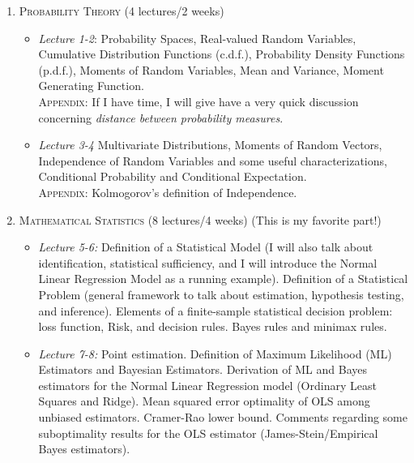 \documentclass[11pt]{article}
\begin{document}
\begin{enumerate}
\item {\scshape Probability Theory} (4 lectures/2 weeks)
\begin{itemize}
\item \emph{Lecture 1-2}: Probability Spaces, Real-valued Random Variables, Cumulative Distribution Functions (c.d.f.),  Probability Density Functions (p.d.f.), Moments of Random Variables, Mean and Variance, Moment Generating Function. \\

{\scshape Appendix:} If I have time, I will give have a very quick discussion concerning \emph{distance between probability measures}. \\

\item \emph{Lecture 3-4} Multivariate Distributions, Moments of Random Vectors, Independence of Random Variables and some useful characterizations, Conditional Probability and Conditional Expectation.  \\

{\scshape Appendix:} Kolmogorov\textquoteright s definition of Independence. \\
\end{itemize}
\item {\scshape Mathematical Statistics} (8 lectures/4 weeks) (This is my favorite part!)
\begin{itemize}
\item \emph{Lecture 5-6:} Definition of a Statistical Model (I will also talk about identification, statistical sufficiency, and I will introduce the Normal Linear Regression Model as a running example). Definition of a Statistical Problem (general framework to talk about estimation, hypothesis testing, and inference). Elements of a finite-sample statistical decision problem: loss function, Risk, and decision rules. Bayes rules and minimax rules.   \\

\item \emph{Lecture 7-8:} Point estimation. Definition of Maximum Likelihood (ML) Estimators and Bayesian Estimators.  Derivation of ML and Bayes estimators for the Normal Linear Regression model (Ordinary Least Squares and Ridge).  Mean squared error optimality of OLS among unbiased estimators. Cramer-Rao lower bound. Comments regarding some suboptimality results for the OLS estimator (James-Stein/Empirical Bayes estimators). \\


\end{itemize}
\end{enumerate}
\end{document}
